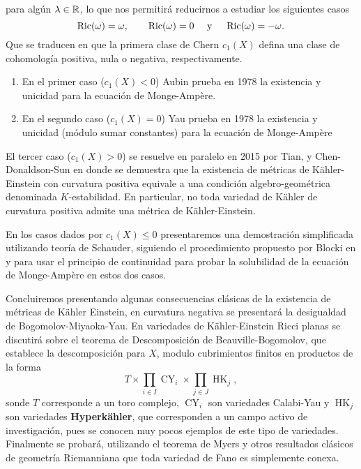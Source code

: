 para alg\'un $\lambda \in \mathbb{R}$, lo que nos permitir\'a reducirnos a estudiar los siguientes casos
\[
\operatorname{Ric}(\omega) = \omega ,\quad \quad \operatorname{Ric}(\omega) = 0 \quad \text{ y } \quad \operatorname{Ric}(\omega)= -\omega.
\]
Que se traducen en que la primera clase de Chern $c_1(X)$ defina una clase de cohomolog\'ia positiva, nula o negativa, respectivamente. 
\begin{enumerate}
\item En el primer caso ($c_1(X)<0$) Aubin prueba en 1978 \cite{Aub78} la existencia y unicidad para la ecuaci\'on de Monge-Amp\`ere.
\item En el segundo caso ($c_1(X)=0$) Yau prueba en 1978 \cite{Yau78} la existencia y unicidad (m\'odulo sumar constantes) para la ecuaci\'on de Monge-Amp\`ere
\end{enumerate}
El tercer caso ($c_1(X)>0$) se resuelve en paralelo en 2015 por Tian, y Chen-Donaldson-Sun \cite{Chen-Don-Sun} en donde se demuestra que la existencia de m\'etricas de K\"ahler-Einstein con curvatura positiva equivale a una condici\'on algebro-geom\'etrica denominada $K$-estabilidad. En particular, no toda variedad de K\"ahler de curvatura positiva admite una m\'etrica de K\"ahler-Einstein.\par
En los casos dados por $c_1(X)\leq 0$ presentaremos una demostraci\'on simplificada utilizando teor\'ia de Schauder, siguiendo el procedimiento propuesto por Blocki en \cite{Blocki12} y \cite{Blocki13} para usar el principio de continuidad para probar la solubilidad de la ecuaci\'on de Monge-Amp\`ere en estos dos casos.\par
Concluiremos presentando algunas consecuencias cl\'asicas de la existencia de m\'etricas de K\"ahler Einstein, en curvatura negativa se presentar\'a la desigualdad de Bogomolov-Miyaoka-Yau. En variedades de K\"ahler-Einstein Ricci planas se discutir\'a sobre el teorema de Descomposici\'on de Beauville-Bogomolov, que establece la descomposici\'on para $X$, modulo cubrimientos finitos en productos de la forma
\[
T \times \prod_{i\in I} \operatorname{CY}_i \times \prod_{j\in J} \operatorname{HK}_j,
\]
sonde $T$ corresponde a un toro complejo, $\operatorname{CY}_i$ son variedades Calabi-Yau y $\operatorname{HK}_j$ son variedades \textbf{Hyperk\"ahler}, que corresponden a un campo activo de investigaci\'on, pues se conocen muy pocos ejemplos de este tipo de variedades. Finalmente se probar\'a, utilizando el teorema de Myers y otros resultados cl\'asicos de geometr\'ia Riemanniana que toda variedad de Fano es simplemente conexa.